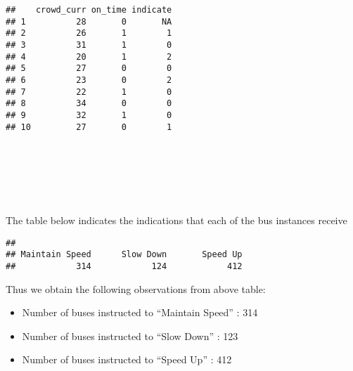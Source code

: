 \documentclass[
]{article}
\newenvironment{Shaded}{\begin{snugshade}}{\end{snugshade}}
\newcommand{\DataTypeTok}[1]{\textcolor[rgb]{0.13,0.29,0.53}{#1}}
\newcommand{\DecValTok}[1]{\textcolor[rgb]{0.00,0.00,0.81}{#1}}
\newcommand{\KeywordTok}[1]{\textcolor[rgb]{0.13,0.29,0.53}{\textbf{#1}}}
\newcommand{\NormalTok}[1]{#1}
\newcommand{\OperatorTok}[1]{\textcolor[rgb]{0.81,0.36,0.00}{\textbf{#1}}}
\newcommand{\StringTok}[1]{\textcolor[rgb]{0.31,0.60,0.02}{#1}}
\providecommand{\tightlist}{%
  \setlength{\itemsep}{0pt}\setlength{\parskip}{0pt}}
\begin{document}
\begin{Shaded}
\begin{Highlighting}[]
{\KeywordTok{head}\NormalTok{(}\KeywordTok{select}\NormalTok{(data,crowd_curr,on_time,indicate),}\DecValTok{10}\NormalTok{)}
\end{Highlighting}
\end{Shaded}

\begin{verbatim}
##    crowd_curr on_time indicate
## 1          28       0       NA
## 2          26       1        1
## 3          31       1        0
## 4          20       1        2
## 5          27       0        0
## 6          23       0        2
## 7          22       1        0
## 8          34       0        0
## 9          32       1        0
## 10         27       0        1
\end{verbatim}

~

~

~

The table below indicates the indications that each of the bus instances
receive

\begin{Shaded}
\end{Shaded}

\begin{verbatim}
## 
## Maintain Speed      Slow Down       Speed Up 
##            314            124            412
\end{verbatim}

Thus we obtain the following observations from above table:

\begin{itemize}
\tightlist
\item
  Number of buses instructed to ``Maintain Speed'' : 314
\item
  Number of buses instructed to ``Slow Down'' : 123
\item
  Number of buses instructed to ``Speed Up'' : 412
\end{itemize}
\end{document}
